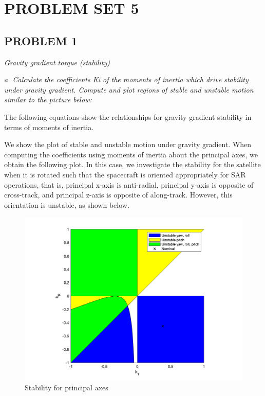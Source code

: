 \section{\Large PROBLEM SET 5}
\subsection{PROBLEM 1}
\textit{Gravity gradient torque (stability)}

\textit{a. Calculate the coefficients Ki of the moments of inertia which drive stability under gravity gradient. Compute and plot regions of stable and unstable motion similar to the picture below:}

The following equations show the relationships for gravity gradient stability in terms of moments of inertia.


We show the plot of stable and unstable motion under gravity gradient. When computing the coefficients using moments of inertia about the principal axes, we obtain the following plot. In this case, we investigate the stability for the satellite when it is rotated such that the spacecraft is oriented appropriately for SAR operations, that is, principal x-axis is anti-radial, principal y-axis is opposite of cross-track, and principal z-axis is opposite of along-track. However, this orientation is unstable, as shown below.

\begin{figure}[H]
\centering
\includegraphics[scale=0.6]{Images/ps5_problem1a.png}
\caption{Stability for principal axes}
\label{fig:ps5_problem1a}
\end{figure}

